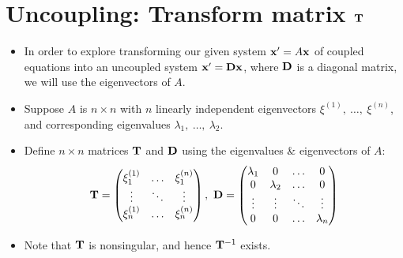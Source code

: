\documentclass[11pt,a4paper]{article}
\begin{document}
	\section*{Uncoupling: Transform matrix $\vb{T}$}
	\begin{itemize}
		\item In order to explore transforming our given system $\vb{x}^\prime = A\vb{x}$ of coupled equations into an uncoupled system $\vb{x}^\prime = \vb{D}\vb{x}$, where $\vb{D}$ is a diagonal matrix, we will use the eigenvectors of $A$.
		\item Suppose $A$ is $n \times n$ with $n$ linearly independent eigenvectors $\xi^{(1)},\ \ldots,\ \xi^{(n)}$, and corresponding eigenvalues $\lambda_1,\ \ldots,\ \lambda_2$.
		\item Define $n \times n$ matrices $\vb{T}$ and $\vb{D}$ using the eigenvalues \& eigenvectors of $A$:
		$$
		\vb{T}=
		\begin{pmatrix}
			\xi_1^{(1)} & \ldots & \xi_1^{(n)}\\
			\vdots & \ddots & \vdots\\
			\xi_n^{(1)} & \ldots & \xi_n^{(n)}
		\end{pmatrix},\ \vb{D} =
		\begin{pmatrix}
			\lambda_1 & 0 & \ldots & 0\\
			0 & \lambda_2 & \ldots & 0\\
			\vdots & \vdots & \ddots & \vdots\\
			0 & 0 & \ldots & \lambda_n
		\end{pmatrix}
		$$
		\item Note that $\vb{T}$ is nonsingular, and hence $\vb{T}^{-1}$ exists.
	\end{itemize}
\end{document}
